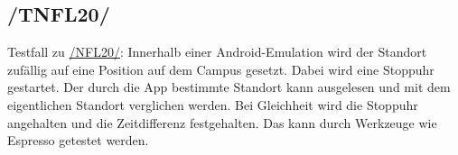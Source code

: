 \subsection*{/TNFL20/}
\label{/TNFL20/} Testfall zu \hyperref[/NFL20/]{/NFL20/}: Innerhalb einer \Gls{Android}-\Gls{Emulation} wird der Standort zufällig auf eine Position auf dem \Gls{Campus} gesetzt.
Dabei wird eine Stoppuhr gestartet.
Der durch die App bestimmte Standort kann ausgelesen und mit dem eigentlichen Standort verglichen werden.
Bei Gleichheit wird die Stoppuhr angehalten und die Zeitdifferenz festgehalten.
Das kann durch Werkzeuge wie \Gls{Espresso} getestet werden.